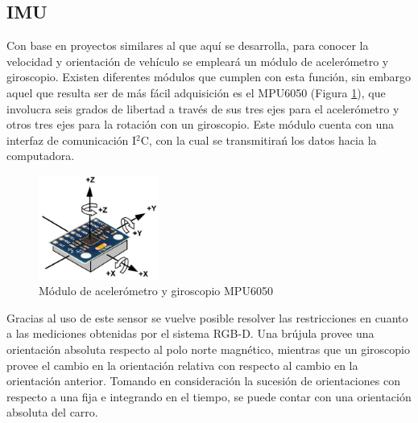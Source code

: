 \subsection{IMU}
\label{ssec:velor}
Con base en proyectos similares al que aquí se desarrolla, para conocer la velocidad y orientación de vehículo se empleará un módulo de acelerómetro y giroscopio. Existen diferentes módulos que cumplen con esta función, sin embargo aquel que resulta ser de más fácil adquisición es el MPU6050 (Figura \ref{fig:MPU6050}), que involucra seis grados de libertad a través de sus tres ejes para el acelerómetro y otros tres ejes para la rotación con un giroscopio. Este módulo cuenta con una interfaz de comunicación I$^{2}$C, con la cual se transmitirań los datos hacia la computadora.
\begin{figure}[htbp!]
	\centering
	\includegraphics[width=0.35\textwidth]{./Figuras/MPU6050}
	\caption{Módulo de acelerómetro y giroscopio MPU6050}
	\label{fig:MPU6050}
\end{figure}
\par Gracias al uso de este sensor se vuelve posible resolver las restricciones en cuanto a las mediciones obtenidas por el sistema RGB-D. Una brújula provee una orientación absoluta respecto al polo norte magnético, mientras que un giroscopio provee el cambio en la orientación relativa con respecto al cambio en la orientación anterior. Tomando en consideración la sucesión de orientaciones con respecto a una fija e integrando en el tiempo, se puede contar con una orientación absoluta del carro.
